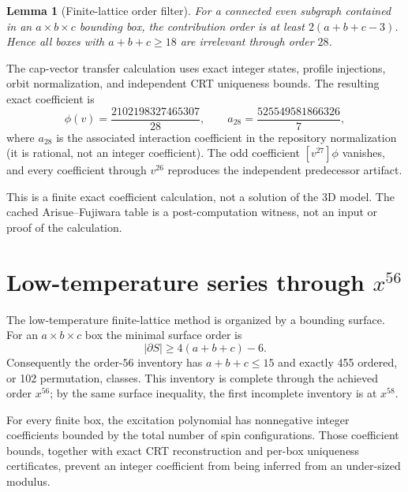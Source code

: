 \documentclass[11pt]{article}
\newtheorem{lemma}[theorem]{Lemma}
\begin{document}
\begin{lemma}[Finite-lattice order filter]
For a connected even subgraph contained in an $a\times b\times c$ bounding box, the contribution order is at least $2(a+b+c-3)$.  Hence all boxes with $a+b+c\ge18$ are irrelevant through order $28$.
\end{lemma}

The cap-vector transfer calculation uses exact integer states, profile injections, orbit normalization, and independent CRT uniqueness bounds.  The resulting exact coefficient is
\begin{equation}
 [v^{28}]\phi(v)=\frac{2102198327465307}{28},
 \qquad a_{28}=\frac{525549581866326}{7},
\end{equation}
where $a_{28}$ is the associated interaction coefficient in the repository normalization (it is rational, not an integer coefficient). The odd coefficient $[v^{27}]\phi$ vanishes, and every coefficient through $v^{26}$ reproduces the independent predecessor artifact.

This is a finite exact coefficient calculation, not a solution of the 3D model.  The cached Arisue--Fujiwara table is a post-computation witness, not an input or proof of the calculation.

\section{Low-temperature series through $x^{56}$}
The low-temperature finite-lattice method is organized by a bounding surface.  For an $a\times b\times c$ box the minimal surface order is
\[
 |\partial S|\ge 4(a+b+c)-6.
\]
Consequently the order-$56$ inventory has $a+b+c\le15$ and exactly 455 ordered, or 102 permutation, classes. This inventory is complete through the achieved order $x^{56}$; by the same surface inequality, the first incomplete inventory is at $x^{58}$.

For every finite box, the excitation polynomial has nonnegative integer coefficients bounded by the total number of spin configurations.  Those coefficient bounds, together with exact CRT reconstruction and per-box uniqueness certificates, prevent an integer coefficient from being inferred from an under-sized modulus.
\end{document}
